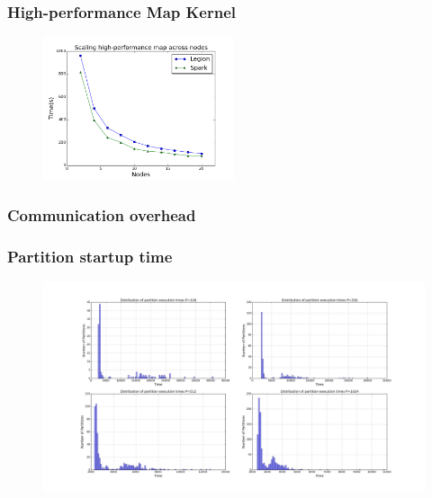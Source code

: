 \documentclass[tog]{acmsiggraph}
\begin{document}
\subsubsection{High-performance Map Kernel}


\begin{figure}[htp]
\label{fig:scaling}\includegraphics[width=0.5\textwidth]{figures/scaling.png}
\end{figure}


\subsubsection{Communication overhead}


\subsubsection{Partition startup time}

\begin{figure}[htp] 
\label{fig:scaling}\includegraphics[width=\textwidth]{figures/partition_dist}
\end{figure}
\end{document}
